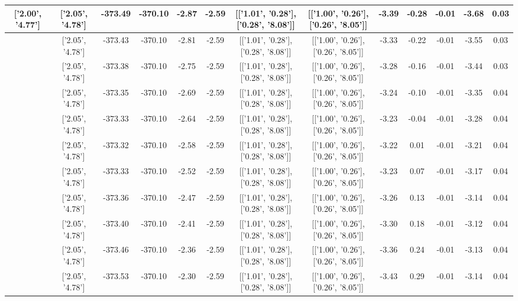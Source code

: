 \begin{table}[htbp]
\begin{adjustbox}{angle=90}
\begin{tabular}{|c|c|c|c|c|c|c|c|c|c|c|c|c|}
 ['2.00', '4.77'] & ['2.05', '4.78'] & -373.49 & -370.10 & -2.87 & -2.59 & [['1.01', '0.28'], ['0.28', '8.08']] & [['1.00', '0.26'], ['0.26', '8.05']] & -3.39 & -0.28 & -0.01 & -3.68 & 0.03\\ \hline
 ['2.01', '4.77'] & ['2.05', '4.78'] & -373.43 & -370.10 & -2.81 & -2.59 & [['1.01', '0.28'], ['0.28', '8.08']] & [['1.00', '0.26'], ['0.26', '8.05']] & -3.33 & -0.22 & -0.01 & -3.55 & 0.03\\ \hline
 ['2.02', '4.78'] & ['2.05', '4.78'] & -373.38 & -370.10 & -2.75 & -2.59 & [['1.01', '0.28'], ['0.28', '8.08']] & [['1.00', '0.26'], ['0.26', '8.05']] & -3.28 & -0.16 & -0.01 & -3.44 & 0.03\\ \hline
 ['2.03', '4.78'] & ['2.05', '4.78'] & -373.35 & -370.10 & -2.69 & -2.59 & [['1.01', '0.28'], ['0.28', '8.08']] & [['1.00', '0.26'], ['0.26', '8.05']] & -3.24 & -0.10 & -0.01 & -3.35 & 0.04\\ \hline
 ['2.04', '4.78'] & ['2.05', '4.78'] & -373.33 & -370.10 & -2.64 & -2.59 & [['1.01', '0.28'], ['0.28', '8.08']] & [['1.00', '0.26'], ['0.26', '8.05']] & -3.23 & -0.04 & -0.01 & -3.28 & 0.04\\ \hline
 ['2.05', '4.78'] & ['2.05', '4.78'] & -373.32 & -370.10 & -2.58 & -2.59 & [['1.01', '0.28'], ['0.28', '8.08']] & [['1.00', '0.26'], ['0.26', '8.05']] & -3.22 & 0.01 & -0.01 & -3.21 & 0.04\\ \hline
 ['2.07', '4.79'] & ['2.05', '4.78'] & -373.33 & -370.10 & -2.52 & -2.59 & [['1.01', '0.28'], ['0.28', '8.08']] & [['1.00', '0.26'], ['0.26', '8.05']] & -3.23 & 0.07 & -0.01 & -3.17 & 0.04\\ \hline
 ['2.08', '4.79'] & ['2.05', '4.78'] & -373.36 & -370.10 & -2.47 & -2.59 & [['1.01', '0.28'], ['0.28', '8.08']] & [['1.00', '0.26'], ['0.26', '8.05']] & -3.26 & 0.13 & -0.01 & -3.14 & 0.04\\ \hline
 ['2.09', '4.79'] & ['2.05', '4.78'] & -373.40 & -370.10 & -2.41 & -2.59 & [['1.01', '0.28'], ['0.28', '8.08']] & [['1.00', '0.26'], ['0.26', '8.05']] & -3.30 & 0.18 & -0.01 & -3.12 & 0.04\\ \hline
 ['2.10', '4.79'] & ['2.05', '4.78'] & -373.46 & -370.10 & -2.36 & -2.59 & [['1.01', '0.28'], ['0.28', '8.08']] & [['1.00', '0.26'], ['0.26', '8.05']] & -3.36 & 0.24 & -0.01 & -3.13 & 0.04\\ \hline
 ['2.11', '4.80'] & ['2.05', '4.78'] & -373.53 & -370.10 & -2.30 & -2.59 & [['1.01', '0.28'], ['0.28', '8.08']] & [['1.00', '0.26'], ['0.26', '8.05']] & -3.43 & 0.29 & -0.01 & -3.14 & 0.04\\ \hline

\end{tabular}
\end{adjustbox}
\end{table}
